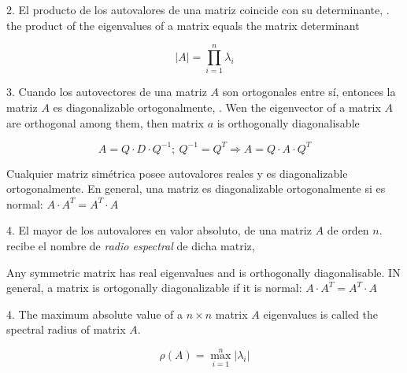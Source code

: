 \begin{paracol}{2}
2. El producto de los autovalores de una matriz coincide con su determinante,
. the product of the eigenvalues of a matrix equals the matrix determinant
\end{paracol}
\begin{equation*}
\left\vert A \right\vert = \prod_{i=1}^n \lambda_i
\end{equation*} 
\begin{paracol}{2}
3. Cuando los autovectores de una matriz $A$ son ortogonales entre sí, entonces la matriz $A$ es diagonalizable ortogonalmente,
. Wen the eigenvector of a matrix $A$ are orthogonal among them, then matrix $a$ is orthogonally diagonalisable
\end{paracol}
\begin{equation*}
A=Q\cdot D \cdot Q^{-1}; \ Q^{-1}=Q^T \Rightarrow A=Q\cdot A \cdot Q^T
\end{equation*}
\begin{paracol}{2}
Cualquier matriz simétrica posee autovalores reales y es diagonalizable ortogonalmente. En general, una matriz es diagonalizable ortogonalmente si es normal: $A\cdot A^T=A^T\cdot A$

4. El mayor de los autovalores en valor absoluto, de una matriz $A$ de orden $n$.  recibe el nombre de \emph{radio espectral} de dicha matriz,

\switchcolumn
Any symmetric matrix has real eigenvalues and is orthogonally diagonalisable. IN general, a matrix  is ortogonally diagonalizable if it is normal:  $A\cdot A^T=A^T\cdot A$

4. The maximum absolute value of a $n\times n$ matrix $A$ eigenvalues is called the spectral radius of matrix $A$.  
\end{paracol}

\begin{equation*}
\rho(A)=\max_{i=1}^n \vert \lambda_i \vert
\end{equation*} 


